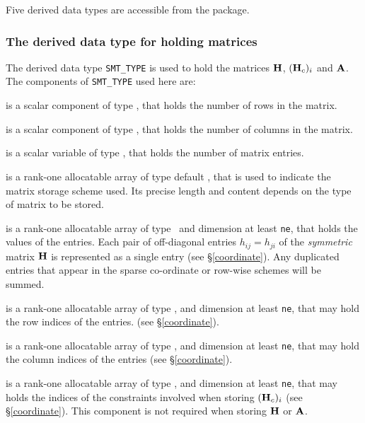 \documentclass{galahad}
\begin{document}
\galtypes
Five derived data types are accessible from the package.


\subsubsection{The derived data type for holding matrices}\label{typesmt}
The derived data type {\tt SMT\_TYPE} is used to hold the matrices
${\mathbf{H}}$, $({\mathbf{H}}_c)_i$ and ${\mathbf{A}}$.
The components of {\tt SMT\_TYPE} used here are:

\begin{description}

 is a scalar component of type \integer,
that holds the number of rows in the matrix.

 is a scalar component of type \integer,
that holds the number of columns in the matrix.

 is a scalar variable of type \integer, that
holds the number of matrix entries.

 is a rank-one allocatable array of type default \character, that
is used to indicate the matrix storage scheme used. Its precise length and
content depends on the type of matrix to be stored.

 is a rank-one allocatable array of type \realdp\,
and dimension at least {\tt ne}, that holds the values of the entries.
Each pair of off-diagonal entries $h_{ij} = h_{ji}$ of the {\em symmetric}
matrix ${\mathbf{H}}$ is represented as a single entry
(see \S\ref{coordinate}).
Any duplicated entries that appear in the sparse
co-ordinate or row-wise schemes will be summed.

 is a rank-one allocatable array of type \integer,
and dimension at least {\tt ne}, that may hold the row indices of the entries.
(see \S\ref{coordinate}).

 is a rank-one allocatable array of type \integer,
and dimension at least {\tt ne}, that may hold the column indices of the entries
(see \S\ref{coordinate}).

 is a rank-one allocatable array of type \integer,
and dimension at least {\tt ne}, that may holds the indices of the
constraints involved when storing $({\mathbf{H}}_c)_i$
(see \S\ref{coordinate}).
This component is not required when storing ${\mathbf{H}}$ or ${\mathbf{A}}$.

\end{description}
\end{document}
